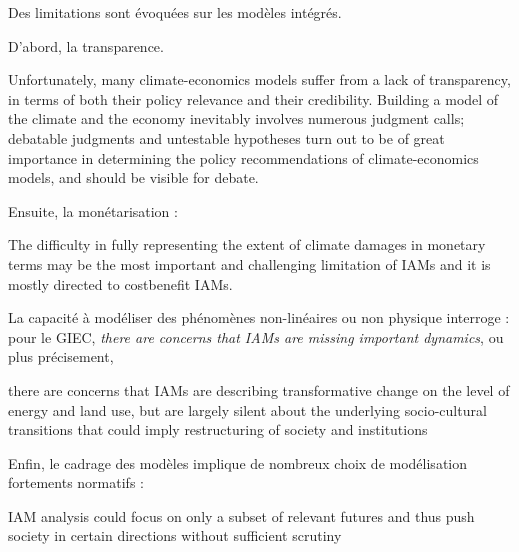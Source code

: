 Des limitations sont  évoquées sur les modèles intégrés. 

D'abord, la transparence.

\begin{authoredquote}
    Unfortunately, many climate-economics models suffer from a lack of transparency, in terms of both their policy relevance and their credibility. Building a model of the climate and the economy inevitably involves numerous judgment calls; debatable judgments and untestable hypotheses turn out to be of great importance in determining the policy recommendations of climate-economics models, and should be visible for debate.
\end{authoredquote}

Ensuite, la monétarisation : 

\begin{authoredquote}
    The difficulty in fully representing the extent of climate damages in monetary terms may be the most important and challenging limitation of IAMs and it is mostly directed to costbenefit IAMs. 
\end{authoredquote}

La capacité à modéliser des phénomènes non-linéaires ou non physique interroge : pour le \Gls{GIEC}, \emph{there are concerns that IAMs are missing important dynamics}, ou plus précisement, 

\begin{authoredquote}
    there are concerns that IAMs are describing transformative change on the level of energy and land use, but are largely silent about the underlying socio-cultural transitions that could imply restructuring of society and institutions
\end{authoredquote}

Enfin, le cadrage des modèles implique de nombreux choix de modélisation fortements normatifs : 

\begin{authoredquote}
    IAM analysis could focus on only a subset of relevant futures and thus push society in certain directions without sufficient scrutiny
\end{authoredquote}



